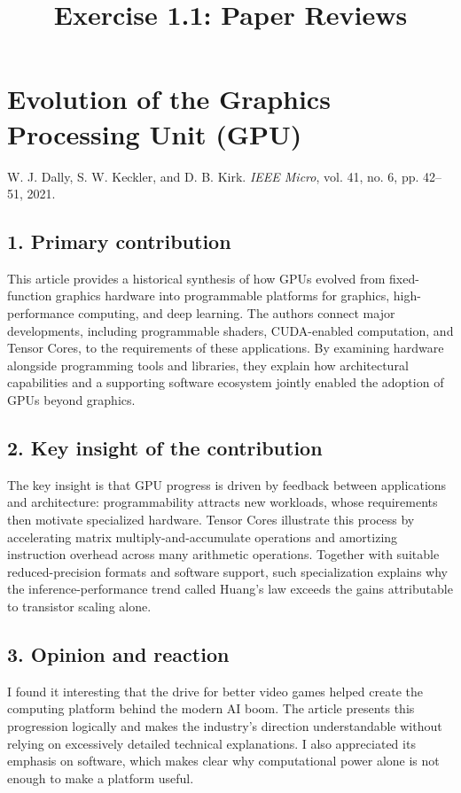 \documentclass[11pt,a4paper]{article}
\title{Exercise 1.1: Paper Reviews}
\author{}
\date{}
\begin{document}
\maketitle
\vspace{-2em}

\section*{Evolution of the Graphics Processing Unit (GPU)}
{\small W. J. Dally, S. W. Keckler, and D. B. Kirk.
\emph{IEEE Micro}, vol. 41, no. 6, pp. 42--51, 2021.}

\subsection*{1. Primary contribution}
This article provides a historical synthesis of how GPUs evolved from
fixed-function graphics hardware into programmable platforms for graphics,
high-performance computing, and deep learning.
The authors connect major developments, including programmable shaders,
CUDA-enabled computation, and Tensor Cores, to the requirements of these
applications.
By examining hardware alongside programming tools and libraries, they
explain how architectural capabilities and a supporting software ecosystem
jointly enabled the adoption of GPUs beyond graphics.

\subsection*{2. Key insight of the contribution}
The key insight is that GPU progress is driven by feedback between applications
and architecture: programmability attracts new workloads, whose requirements
then motivate specialized hardware.
Tensor Cores illustrate this process by accelerating matrix
multiply-and-accumulate operations and amortizing instruction overhead
across many arithmetic operations.
Together with suitable reduced-precision formats and software support,
such specialization explains why the inference-performance trend called
Huang's law exceeds the gains attributable to transistor scaling alone.

\subsection*{3. Opinion and reaction}
I found it interesting that the drive for better video games helped create
the computing platform behind the modern AI boom.
The article presents this progression logically and makes the industry's
direction understandable without relying on excessively detailed technical
explanations.
I also appreciated its emphasis on software, which makes clear why
computational power alone is not enough to make a platform useful.
\end{document}
